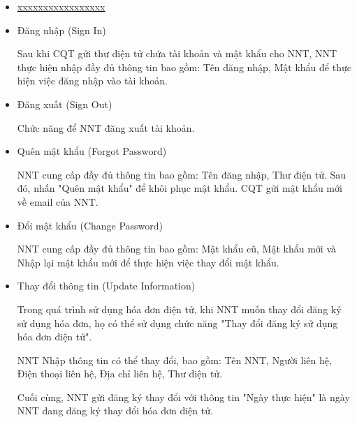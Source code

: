 \begin{itemize}
\begin{itemize}



              \item \underline{xxxxxxxxxxxxxxxxx}
              \item Đăng nhập (Sign In)

                    Sau khi CQT gửi thư điện tử chứa tài khoản và mật khẩu cho NNT, NNT thực hiện nhập đầy đủ thông tin bao gồm: Tên đăng nhập, Mật khẩu để thực hiện việc đăng nhập vào tài khoản.

              \item Đăng xuất (Sign Out)

                    Chức năng để NNT đăng xuất tài khoản.

              \item Quên mật khẩu (Forgot Password)

                    NNT cung cấp đầy đủ thông tin bao gồm: Tên đăng nhập, Thư điện tử. Sau đó, nhấn "Quên mật khẩu" để khôi phục mật khẩu. CQT gửi mật khẩu mới về email của NNT.

              \item Đổi mật khẩu (Change Password)

                    NNT cung cấp đầy đủ thông tin bao gồm: Mật khẩu cũ, Mật khẩu mới và Nhập lại mật khẩu mới để thực hiện việc thay đổi mật khẩu.

              \item Thay đổi thông tin (Update Information)

                    Trong quá trình sử dụng hóa đơn điện tử, khi NNT muốn thay đổi đăng ký sử dụng hóa đơn, họ có thể sử dụng chức năng "Thay đổi đăng ký sử dụng hóa đơn điện tử".

                    NNT Nhập thông tin có thể thay đổi, bao gồm: Tên NNT, Người liên hệ, Điện thoại liên hệ, Địa chỉ liên hệ, Thư điện tử.

                    Cuối cùng, NNT gửi đăng ký thay đổi với thông tin "Ngày thực hiện" là ngày NNT đang đăng ký thay đổi hóa đơn điện tử.


\end{itemize}
\end{itemize}
